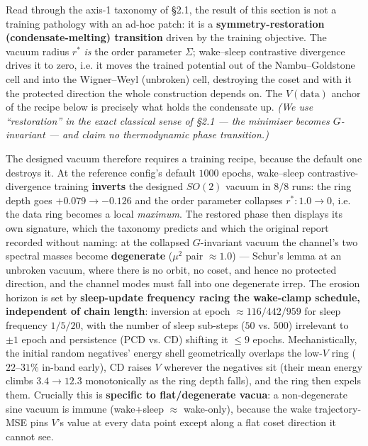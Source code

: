 \documentclass[10pt]{article}
\begin{document}
Read through the axis-1 taxonomy of \S2.1, the result of this section is not a training pathology with an ad-hoc patch: it is a \textbf{symmetry-restoration (condensate-melting) transition} driven by the training objective. The vacuum radius $r^*$ \emph{is} the order parameter $\Sigma$; wake--sleep contrastive divergence drives it to zero, i.e. it moves the trained potential out of the Nambu--Goldstone cell and into the Wigner--Weyl (unbroken) cell, destroying the coset and with it the protected direction the whole construction depends on. The $V(\text{data})$ anchor of the recipe below is precisely what holds the condensate up. \emph{(We use ``restoration'' in the exact classical sense of \S2.1 --- the minimiser becomes $G$-invariant --- and claim no thermodynamic phase transition.)}

The designed vacuum therefore requires a training recipe, because the default one destroys it. At the reference config's default $1000$ epochs, wake--sleep contrastive-divergence training \textbf{inverts} the designed $SO(2)$ vacuum in $8/8$ runs: the ring depth goes $+0.079\to-0.126$ and the order parameter collapses $r^*:1.0\to0$, i.e. the data ring becomes a local \emph{maximum}. The restored phase then displays its own signature, which the taxonomy predicts and which the original report recorded without naming: at the collapsed $G$-invariant vacuum the channel's two spectral masses become \textbf{degenerate} ($\mu^2$ pair $\approx1.0$) --- Schur's lemma at an unbroken vacuum, where there is no orbit, no coset, and hence no protected direction, and the channel modes must fall into one degenerate irrep. The erosion horizon is set by \textbf{sleep-update frequency racing the wake-clamp schedule, independent of chain length}: inversion at epoch $\approx116/442/959$ for sleep frequency $1/5/20$, with the number of sleep sub-steps ($50$ vs. $500$) irrelevant to $\pm1$ epoch and persistence (PCD vs. CD) shifting it $\le9$ epochs. Mechanistically, the initial random negatives' energy shell geometrically overlaps the low-$V$ ring ($22$--$31\%$ in-band early), CD raises $V$ wherever the negatives sit (their mean energy climbs $3.4\to12.3$ monotonically as the ring depth falls), and the ring then expels them. Crucially this is \textbf{specific to flat/degenerate vacua}: a non-degenerate sine vacuum is immune (wake+sleep $\approx$ wake-only), because the wake trajectory-MSE pins $V$'s value at every data point except along a flat coset direction it cannot see.
\end{document}

